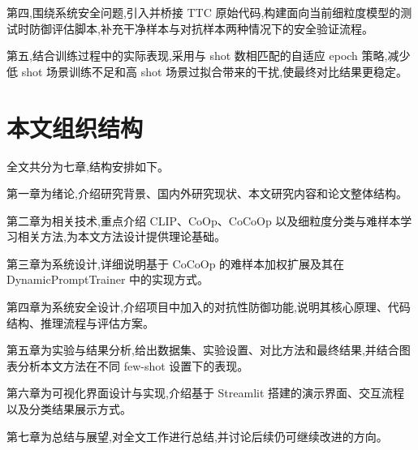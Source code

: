 第四,围绕系统安全问题,引入并桥接 TTC 原始代码,构建面向当前细粒度模型的测试时防御评估脚本,补充干净样本与对抗样本两种情况下的安全验证流程。

第五,结合训练过程中的实际表现,采用与 shot 数相匹配的自适应 epoch 策略,减少低 shot 场景训练不足和高 shot 场景过拟合带来的干扰,使最终对比结果更稳定。

\section{本文组织结构}

全文共分为七章,结构安排如下。

第一章为绪论,介绍研究背景、国内外研究现状、本文研究内容和论文整体结构。

第二章为相关技术,重点介绍 CLIP、CoOp、CoCoOp 以及细粒度分类与难样本学习相关方法,为本文方法设计提供理论基础。

第三章为系统设计,详细说明基于 CoCoOp 的难样本加权扩展及其在 DynamicPromptTrainer 中的实现方式。

第四章为系统安全设计,介绍项目中加入的对抗性防御功能,说明其核心原理、代码结构、推理流程与评估方案。

第五章为实验与结果分析,给出数据集、实验设置、对比方法和最终结果,并结合图表分析本文方法在不同 few-shot 设置下的表现。

第六章为可视化界面设计与实现,介绍基于 Streamlit 搭建的演示界面、交互流程以及分类结果展示方式。

第七章为总结与展望,对全文工作进行总结,并讨论后续仍可继续改进的方向。
